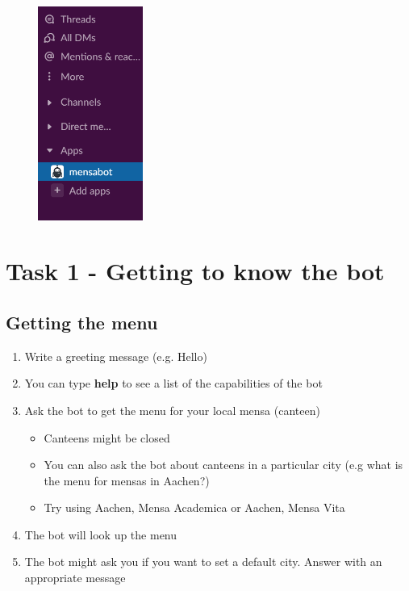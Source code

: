 \begin{figure}[h]
    \centering
    \includegraphics[height=7cm]{bot.png}
\end{figure}


      
\section*{Task 1 - Getting to know the bot}
\subsection*{Getting the menu}
\begin{enumerate}
    \item Write a greeting message (e.g. Hello)
    \item You can type \textbf{help} to see a list of the capabilities of the bot
    \item Ask the bot to get the menu for your local mensa (canteen)
    \begin{itemize}
      \item Canteens might be closed
      \item You can also ask the bot about canteens in a particular city (e.g what is the menu for mensas in Aachen?)
      \item Try using Aachen, Mensa Academica or Aachen, Mensa Vita
    \end{itemize}
    \item The bot will look up the menu
    \item The bot might ask you if you want to set a default city. Answer with an appropriate message
\end{enumerate}
